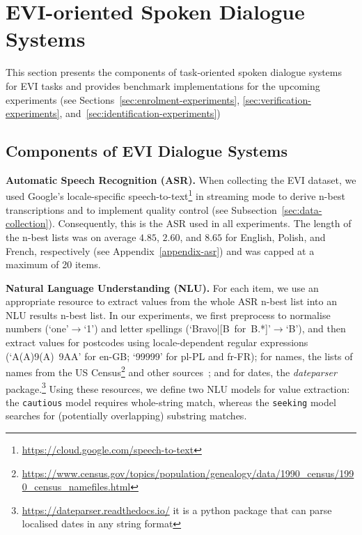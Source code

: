 \documentclass[11pt]{article}
\newcommand{\sparagraph}[1]{\noindent\textbf{#1.}}
\newcommand{\rparagraph}[1]{\vspace{1.4mm}\noindent\textbf{#1.}}
\begin{document}
{%
 



 

\section{EVI-oriented Spoken Dialogue Systems}
\label{sec:methods}

This section presents the components of task-oriented spoken dialogue systems for EVI tasks and provides benchmark implementations for the upcoming experiments
(see Sections~\ref{sec:enrolment-experiments}, \ref{sec:verification-experiments}, and~\ref{sec:identification-experiments})




\subsection{Components of EVI Dialogue Systems}
\label{sec:evi-shared-components}

\sparagraph{Automatic Speech Recognition (ASR)}
When collecting the EVI dataset,
we used Google's locale-specific speech-to-text\footnote{\url{https://cloud.google.com/speech-to-text}}
in streaming mode
to derive n-best transcriptions
and to implement quality control (see Subsection~\ref{sec:data-collection}).
Consequently, this is the ASR used in all experiments.
{The length of the n-best lists was on average $4.85$, $2.60$, and $8.65$ for English, Polish, and French, respectively (see Appendix~\ref{appendix-asr})
and was capped at a maximum of 20 items.}

\rparagraph{Natural Language Understanding (NLU)}
For each item, we use an appropriate resource
to extract values from the whole ASR n-best list
into an NLU results n-best list.
In our experiments,
we first preprocess
to normalise numbers (`one'$\rightarrow$`1')
and letter spellings (`Bravo|[B~for~B.*]'$\rightarrow$`B'),
and then extract values
for postcodes
using
locale-dependent regular expressions
(`A(A)9(A)~9AA' for {en-GB}; `99999' for {pl-PL} and {fr-FR});
for names,
the lists of names from
the US Census\footnote{\url{ https://www.census.gov/topics/population/genealogy/data/1990_census/1990_census_namefiles.html}} and other sources~\cite{NameDataset2021};
and for {dates},
the \textit{dateparser} package.\footnote{\url{https://dateparser.readthedocs.io/} it is a python package that can parse localised dates in any string format}
Using these resources, we define two NLU models for value extraction:
the \texttt{cautious} model requires whole-string match,
whereas the \texttt{seeking} model searches for (potentially overlapping) substring matches.


}
\end{document}

